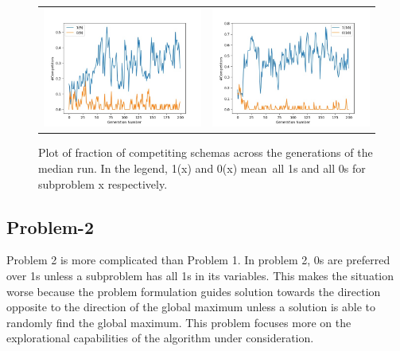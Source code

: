 \documentclass{article}
\begin{document}
\begin{figure}[H]
\begin{adjustbox}{width=0.6\paperwidth}
\begin{tabular}{c c}
				\includegraphics{Codes/Problem_1 Construction_2/Comp_9.jpg}&
				\includegraphics{Codes/Problem_1 Construction_2/Comp_10.jpg}\\
			\end{tabular}
		\end{adjustbox}

		\caption{Plot of fraction of competiting schemas across the generations of the median run. In the legend, 1(x) and 0(x) mean\ all 1s and all 0s for subproblem x respectively.}
		\label{Prob_1_Const_2_Comp_Plot}
	\end{figure}

\subsection{Problem-2}
Problem 2 is more complicated than Problem 1. In problem 2, 0s are preferred over 1s unless a subproblem has all 1s in its variables. This makes the situation worse because the problem formulation guides solution towards the direction opposite to the direction of the global maximum unless a solution is able to randomly find the global maximum. This problem focuses more on the explorational capabilities of the algorithm under consideration.
\end{document}
